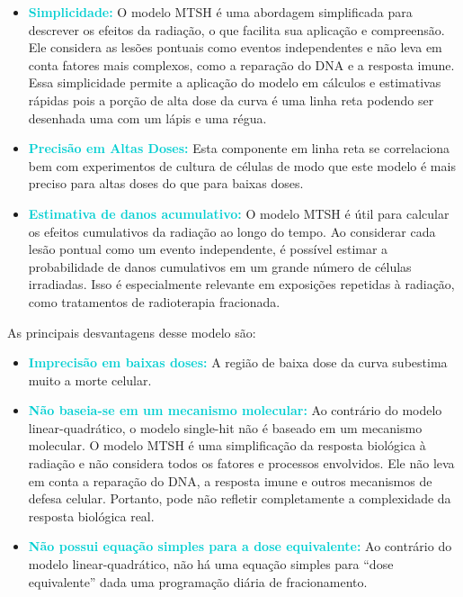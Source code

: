 \documentclass[11pt,a4paper]{article}
\begin{document}
	  \begin{itemize}
		\item \textcolor{DarkTurquoise}{\textbf{Simplicidade:}} O modelo MTSH é uma abordagem simplificada para descrever os efeitos da radiação, o que facilita sua aplicação e compreensão. Ele considera as lesões pontuais como eventos independentes e não leva em conta fatores mais complexos, como a reparação do DNA e a resposta imune. Essa simplicidade permite a aplicação do modelo em cálculos e estimativas rápidas pois a porção de alta dose da curva é uma linha reta podendo ser desenhada uma com um lápis e uma régua.
		\item \textcolor{DarkTurquoise}{\textbf{Precisão em Altas Doses:}} Esta componente em linha reta se correlaciona bem com experimentos de cultura de células de modo que este modelo é mais preciso para altas doses do que para baixas doses.
		\item \textcolor{DarkTurquoise}{\textbf{Estimativa de danos acumulativo:}} O modelo MTSH é útil para calcular os efeitos cumulativos da radiação ao longo do tempo. Ao considerar cada lesão pontual como um evento independente, é possível estimar a probabilidade de danos cumulativos em um grande número de células irradiadas. Isso é especialmente relevante em exposições repetidas à radiação, como tratamentos de radioterapia fracionada.
	  \end{itemize}

	  As principais desvantagens desse modelo são:

	  \begin{itemize}
		\item \textcolor{DarkTurquoise}{\textbf{Imprecisão em baixas doses:}} A região de baixa dose da curva subestima muito a morte celular.
		\item \textcolor{DarkTurquoise}{\textbf{Não baseia-se em um mecanismo molecular:}} Ao contrário do modelo linear-quadrático, o modelo single-hit não é baseado em um mecanismo molecular. O modelo MTSH é uma simplificação da resposta biológica à radiação e não considera todos os fatores e processos envolvidos. Ele não leva em conta a reparação do DNA, a resposta imune e outros mecanismos de defesa celular. Portanto, pode não refletir completamente a complexidade da resposta biológica real.
		\item \textcolor{DarkTurquoise}{\textbf{Não possui equação simples para a dose equivalente:}} Ao contrário do modelo linear-quadrático, não há uma equação simples para “dose equivalente” dada uma programação diária de fracionamento. 
	  \end{itemize} 
\end{document}
